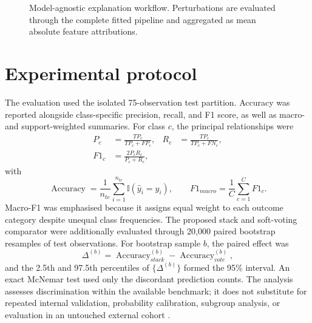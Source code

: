 ﻿\documentclass[preprint,12pt]{elsarticle}
\begin{document}
\begin{figure}[t]
\centering
{}
\caption{Model-agnostic explanation workflow. Perturbations are evaluated through the complete fitted pipeline and aggregated as mean absolute feature attributions.}
\label{fig:shap}
\end{figure}

\FloatBarrier

\section{Experimental protocol}
The evaluation used the isolated 75-observation test partition. Accuracy was reported alongside class-specific precision, recall, and F1 score, as well as macro- and support-weighted summaries. For class $c$, the principal relationships were
\begin{equation}
\begin{aligned}
P_c&=\frac{TP_c}{TP_c+FP_c}, &
R_c&=\frac{TP_c}{TP_c+FN_c},\\
F1_c&=\frac{2P_cR_c}{P_c+R_c},
\end{aligned}
\label{eq:classmetrics}
\end{equation}
with
\begin{equation}
\operatorname{Accuracy}=\frac{1}{n_{te}}\sum_{i=1}^{n_{te}}\mathbb{I}(\hat y_i=y_i),
\qquad
F1_{macro}=\frac{1}{C}\sum_{c=1}^{C}F1_c.
\label{eq:aggregatemetrics}
\end{equation}
Macro-F1 was emphasised because it assigns equal weight to each outcome category despite unequal class frequencies. The proposed stack and soft-voting comparator were additionally evaluated through 20,000 paired bootstrap resamples of test observations. For bootstrap sample $b$, the paired effect was
\begin{equation}
\Delta^{(b)}=\operatorname{Accuracy}^{(b)}_{stack}
-\operatorname{Accuracy}^{(b)}_{vote},
\label{eq:bootstrap}
\end{equation}
and the 2.5th and 97.5th percentiles of $\{\Delta^{(b)}\}$ formed the 95\% interval. An exact McNemar test used only the discordant prediction counts. The analysis assesses discrimination within the available benchmark; it does not substitute for repeated internal validation, probability calibration, subgroup analysis, or evaluation in an untouched external cohort \cite{collins2024,riley2024,rileysample2024}.
\end{document}
